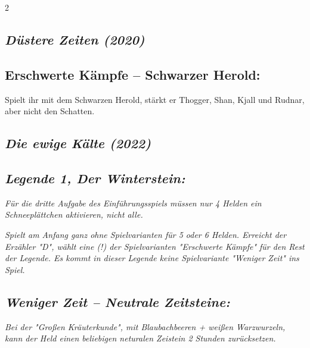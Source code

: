 \documentclass[10pt, a4paper, oneside]{book}
\newcommand{\fan}[1]{\textit{#1}}
\begin{document}
\begin{multicols*}{2}
\begin{bgcolor}[color-AG]
\end{bgcolor}



\begin{bgcolor}[color-DZ]
\section{\fan{Düstere Zeiten (2020)}}

\subsection{Erschwerte Kämpfe – Schwarzer Herold:}

Spielt ihr mit dem Schwarzen Herold, stärkt er Thogger, Shan, Kjall und Rudnar, aber nicht den Schatten.
\supercite{DZ:Begleitheft}


\end{bgcolor}


\begin{bgcolor}
\section{\fan{Die ewige Kälte (2022)}}


\subsection{\fan{Legende 1, Der Winterstein:}}


\fan{Für die dritte Aufgabe des Einführungsspiels müssen nur 4 Helden ein Schneeplättchen aktivieren, nicht alle.}

\fan{Spielt am Anfang ganz ohne Spielvarianten für 5 oder 6 Helden. Erreicht der Erzähler "D", wählt eine (!) der Spielvarianten "Erschwerte Kämpfe" für den Rest der Legende. Es kommt in dieser Legende keine Spielvariante "Weniger Zeit" ins Spiel.}


\subsection{\fan{Weniger Zeit – Neutrale Zeitsteine:}}

\fan{Bei der "Großen Kräuterkunde", mit Blaubachbeeren + weißen Warzwurzeln, kann der Held einen beliebigen neturalen Zeistein 2 Stunden zurücksetzen.}

\end{bgcolor}




\columnbreak




\end{multicols*}
\end{document}
